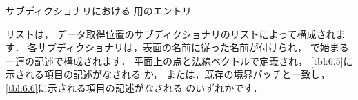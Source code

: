 \begin{table}[ht]
 
 \caption{サブディクショナリにおける
 用のエントリ}
 \label{tbl:6.5}
\end{table}


\begin{table}[ht]
 
 \caption{サブディクショナリにおける
%
%
 用のエントリ}
 \label{tbl:6.6}
\end{table}


リストは，
データ取得位置のサブディクショナリのリストによって構成されます．
各サブディクショナリは，表面の名前に従った名前が付けられ，
で始まる一連の記述で構成されます．
平面上の点と法線ベクトルで定義され，
\autoref{tbl:6.5}に示される項目の記述がなされる
か，
または，既存の境界パッチと一致し，
\autoref{tbl:6.6}に示される項目の記述がなされる
のいずれかです．



